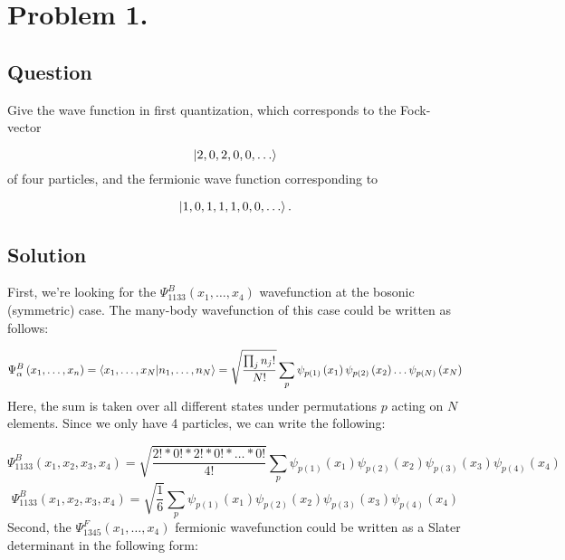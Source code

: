\section*{Problem 1.}
\subsection*{Question}
Give the wave function in first quantization, which corresponds to the Fock-vector

\begin{equation*}
\ket{2,0,2,0,0, \dots}
\end{equation*}
of four particles, and the fermionic wave function corresponding to

\begin{equation*}
\ket{1,0,1,1,1,0,0,  \dots}.
\end{equation*}

\subsection*{Solution}
First, we're looking for the $\Psi^{B}_{1133} \left( x_{1}, \dots, x_{4} \right)$ wavefunction at the bosonic (symmetric) case. The many-body wavefunction of this case could be written as follows:

\begin{equation} \label{eq:1}
\Psi^{B}_{\alpha} \left( x_{1}, \dots, x_{n} \right)
=
\braket{x_{1}, \dots, x_{N} | n_{1}, \dots, n_{N}}
=
\sqrt{\frac{\prod_{j} n_{j}!}{N!}}
\sum_{p}
\psi_{p \left( 1 \right)} \left( x_{1} \right)
\psi_{p \left( 2 \right)} \left( x_{2} \right)
\dots
\psi_{p \left( N \right)} \left( x_{N} \right)
\end{equation}
Here, the sum is taken over all different states under permutations $p$ acting on $N$ elements. Since we only have 4 particles, we can write the following:

\begin{equation} \label{eq:2}
\Psi^{B}_{1133} \left( x_{1}, x_{2}, x_{3}, x_{4} \right)
=
\sqrt{\frac{2!*0!*2!*0!*\dots*0!}{4!}}
\sum_{p}
\psi_{p \left( 1 \right)} \left( x_{1} \right)
\psi_{p \left( 2 \right)} \left( x_{2} \right)
\psi_{p \left( 3 \right)} \left( x_{3} \right)
\psi_{p \left( 4 \right)} \left( x_{4} \right)
\end{equation}
\begin{equation} \label{eq:3}
\Psi^{B}_{1133} \left( x_{1}, x_{2}, x_{3}, x_{4} \right)
=
\sqrt{\frac{1}{6}}
\sum_{p}
\psi_{p \left( 1 \right)} \left( x_{1} \right)
\psi_{p \left( 2 \right)} \left( x_{2} \right)
\psi_{p \left( 3 \right)} \left( x_{3} \right)
\psi_{p \left( 4 \right)} \left( x_{4} \right)
\end{equation}
Second, the $\Psi^{F}_{1345} \left( x_{1}, \dots, x_{4} \right)$ fermionic wavefunction could be written as a Slater determinant in the following form:

